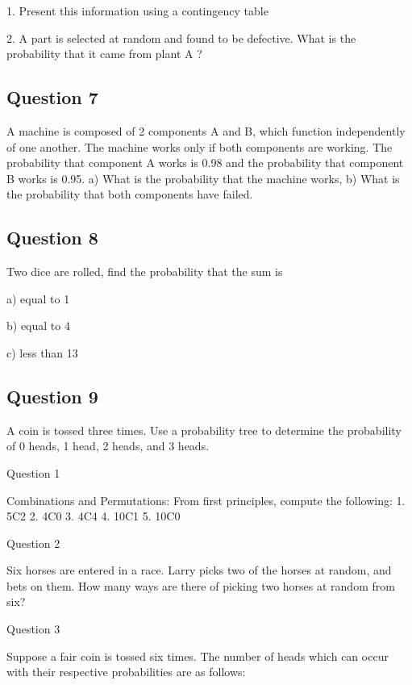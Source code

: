 1.	Present this information using a contingency table

2.	A part is selected at random and found to be defective. What is the probability that it came from plant A ?
\subsection{Question 7}
A machine is composed of 2 components A and B, which function independently of one another. The machine works only if both components are working. The probability that component A works is 0.98 and the probability that component B works is 0.95.
a)	What is the probability that the machine works, 
b)	What is the probability that both components have failed.
 
\subsection{Question 8} 
Two dice are rolled, find the probability that the sum is 

a) equal to 1 

b) equal to 4 

c) less than 13

\subsection{Question 9}
A coin is tossed three times. Use a probability tree to determine the probability of 0 heads, 1 head, 2 heads, and 3 heads.








Question 1 

Combinations and Permutations: From first principles, compute the following:
1.	5C2
2.	4C0
3.	4C4
4.	10C1
5.	10C0

Question 2

Six horses are entered in a race. Larry picks two of the horses at random, and bets on them. 
How many ways are there of picking two horses at random from six?

Question 3

Suppose a fair coin is tossed six times. The number of heads which can occur with their respective
probabilities are as follows:

